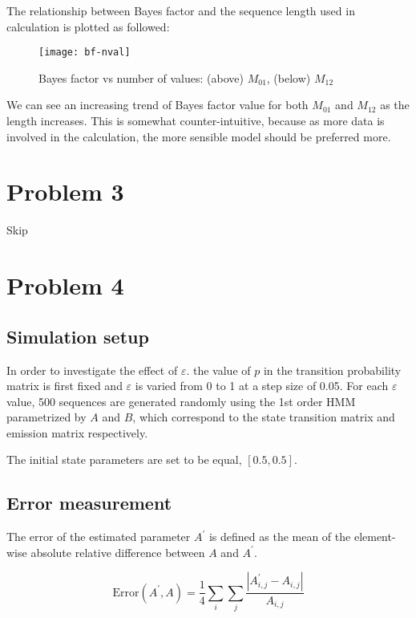 \documentclass[paper=a4, fontsize=11pt]{scrartcl} %
\numberwithin{equation}{section} %
\numberwithin{figure}{section} %
\numberwithin{table}{section} %
\begin{document}
The relationship between Bayes factor and the sequence length used in calculation is plotted as followed:

\begin{figure}[H]
  \centering
  \texttt{[image: bf-nval]}
  \caption{Bayes factor vs number of values: (above) $M_{01}$, (below) $M_{12}$}
\end{figure}

We can see an increasing trend of Bayes factor value for both $M_{01}$ and $M_{12}$ as the length increases. This is somewhat counter-intuitive, because as more data is involved in the calculation, the more sensible model should be preferred more.

\section{Problem 3}
Skip


\section{Problem 4}

\subsection {Simulation setup}
In order to investigate the effect of $\varepsilon$. the value of $p$ in the transition probability matrix is first fixed and $\varepsilon$ is varied  from 0 to 1 at a step size of 0.05. For each $\varepsilon$ value, 500 sequences are generated randomly using the 1st order HMM parametrized by $A$ and $B$, which correspond to the state transition matrix and emission matrix respectively.

The initial state parameters are set to be equal, $[0.5, 0.5]$.

\subsection{Error measurement}

The error of the estimated parameter $A^{'}$ is defined as the mean of the element-wise absolute relative difference between $A$ and $A^{'}$.

\[ \mathrm{Error} (A^{'}, A) = \frac {1} {4} \sum_{i} \sum_{j} \frac{|A^{'}_{i,j} - A_{i,j}|}{A_{i,j}} \]
\end{document}
